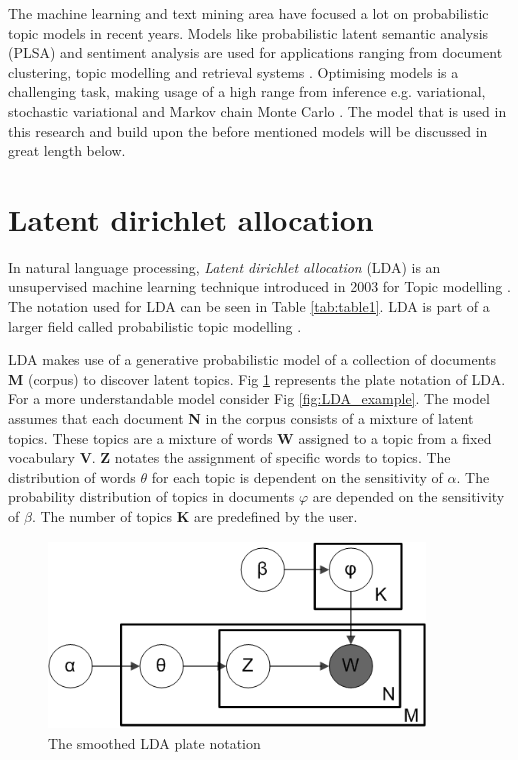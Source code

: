 The machine learning and text mining area have focused a lot on probabilistic topic models in recent years. Models like probabilistic latent semantic analysis (PLSA) and sentiment analysis are used for applications ranging from document clustering, topic modelling and retrieval systems \cite{Lu2011InvestigatingLDA}. Optimising models is a challenging task, making usage of a high range from inference e.g. variational, stochastic variational and Markov chain Monte Carlo \cite{Hoffman2016MarkovModels}. The model that is used in this research and build upon the before mentioned models will be discussed in great length below.


\section{Latent dirichlet allocation}\label{lda:lda}
In natural language processing, \textit{Latent dirichlet allocation} (LDA) is an unsupervised machine learning technique introduced in 2003 for Topic modelling \cite{Blei2003}. The notation used for LDA can be seen in Table \ref{tab:table1}. LDA is part of a larger field called probabilistic topic modelling \cite{Blei2010}.

LDA makes use of a generative probabilistic model of a collection of documents \textbf{M} (corpus) to discover latent topics. Fig \ref{fig:LDA} represents the plate notation of LDA. For a more understandable model consider Fig \ref{fig:LDA_example}. The model assumes that each document \textbf{N} in the corpus consists of a mixture of latent topics. These topics are a mixture of words \textbf{W} assigned to a topic from a fixed vocabulary \textbf{V}. \textbf{Z} notates the assignment of specific words to topics. The distribution of words $\theta$ for each topic is dependent on the sensitivity of $\alpha$. The probability distribution of topics in documents $\varphi$ are depended on the sensitivity of $\beta$. The number of topics \textbf{K} are predefined by the user. 

\begin{figure}
    \centering
    \includegraphics[width=10cm, height=5cm]{methodology/Smoothed_LDA.png}
    \caption{The smoothed LDA plate notation}
    \label{fig:LDA}
\end{figure}

